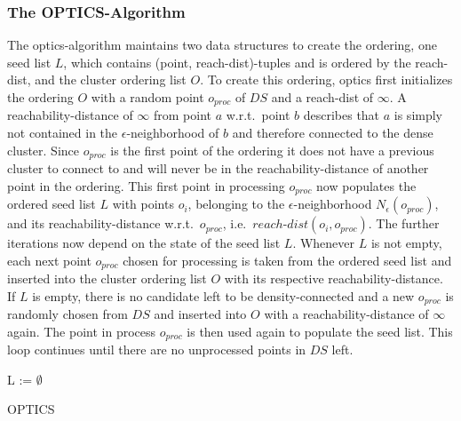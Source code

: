 \subsubsection*{The OPTICS-Algorithm} %
The \gls{optics}-algorithm maintains two data structures to create the ordering, one seed list $L$, which contains (point, reach-dist)-tuples and is ordered by the reach-dist, and the cluster ordering list $O$. 
To create this ordering, \gls{optics} first initializes the ordering $O$ with a random point $o_{proc}$ of $DS$ and a reach-dist of $\infty$. A reachability-distance of $\infty$ from point $a$ w.r.t.\ point $b$ describes that $a$  is simply not contained in the $\epsilon$-neighborhood of $b$ and therefore connected to the dense cluster. Since $o_{proc}$ is the first point of the ordering it does not have a previous cluster to connect to and will never be in the reachability-distance of another point in the ordering. This first point in processing $o_{proc}$ now populates the ordered seed list $L$ with points $o_i$, belonging to the $\epsilon$-neighborhood $N_\epsilon(o_{proc})$, and its reachability-distance w.r.t.\ $o_{proc}$, i.e.\ $reach$-$dist(o_i, o_{proc})$. The further iterations now depend on the state of the seed list $L$. Whenever $L$ is not empty, each next point $o_{proc}$ chosen for processing is taken from the ordered seed list and inserted into the cluster ordering list $O$ with its respective reachability-distance. If $L$ is empty, there is no candidate left to be density-connected and a new $o_{proc}$ is randomly chosen from $DS$ and inserted into $O$ with a reachability-distance of $\infty$ again. The point in process $o_{proc}$ is then used again to populate the seed list. This loop continues until there are no unprocessed points in $DS$ left.



\begin{algorithm}[H]
\SetAlgoLined
{}
 L := $\emptyset$\;
 \caption{OPTICS}
\end{algorithm}

